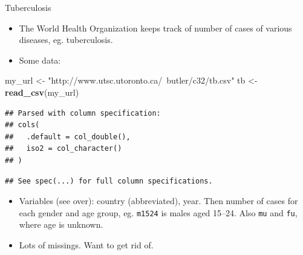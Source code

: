 \documentclass[
  ignorenonframetext,
]{beamer}
\newenvironment{Shaded}{\begin{snugshade}}{\end{snugshade}}
\newcommand{\KeywordTok}[1]{\textcolor[rgb]{0.13,0.29,0.53}{\textbf{#1}}}
\newcommand{\NormalTok}[1]{#1}
\newcommand{\StringTok}[1]{\textcolor[rgb]{0.31,0.60,0.02}{#1}}
\providecommand{\tightlist}{%
  \setlength{\itemsep}{0pt}\setlength{\parskip}{0pt}}
\begin{document}
\begin{frame}[fragile]{Tuberculosis}
\protect\hypertarget{tuberculosis}{}

\begin{itemize}
\tightlist
\item
  The World Health Organization keeps track of number of cases of
  various diseases, eg. tuberculosis.
\item
  Some data:
\end{itemize}

\begin{Shaded}
\begin{Highlighting}[]
\NormalTok{my_url <-}\StringTok{ "http://www.utsc.utoronto.ca/~butler/c32/tb.csv"}
\NormalTok{tb <-}\StringTok{ }\KeywordTok{read_csv}\NormalTok{(my_url)}
\end{Highlighting}
\end{Shaded}

\begin{verbatim}
## Parsed with column specification:
## cols(
##   .default = col_double(),
##   iso2 = col_character()
## )
\end{verbatim}

\begin{verbatim}
## See spec(...) for full column specifications.
\end{verbatim}

\begin{itemize}
\tightlist
\item
  Variables (see over): country (abbreviated), year. Then number of
  cases for each gender and age group, eg. \texttt{m1524} is males aged
  15--24. Also \texttt{mu} and \texttt{fu}, where age is unknown.
\item
  Lots of missings. Want to get rid of.
\end{itemize}

\end{frame}
\end{document}
